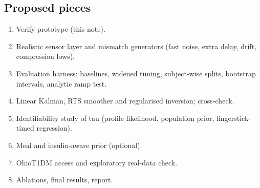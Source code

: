 \documentclass[11pt,a4paper]{article}
\providecommand{\tightlist}{\setlength{\itemsep}{0pt}\setlength{\parskip}{0pt}}
\begin{document}
\hypertarget{proposed-pieces}{%
\subsection{Proposed pieces}\label{proposed-pieces}}

\begin{enumerate}
\def\labelenumi{\arabic{enumi}.}
\tightlist
\item
  Verify prototype (this note).
\item
  Realistic sensor layer and mismatch generators (fast noise, extra
  delay, drift, compression lows).
\item
  Evaluation harness: baselines, widened tuning, subject-wise splits,
  bootstrap intervals, analytic ramp test.
\item
  Linear Kalman, RTS smoother and regularised inversion; cross-check.
\item
  Identifiability study of tau (profile likelihood, population prior,
  fingerstick-timed regression).
\item
  Meal and insulin-aware prior (optional).
\item
  OhioT1DM access and exploratory real-data check.
\item
  Ablations, final results, report.
\end{enumerate}
\end{document}
